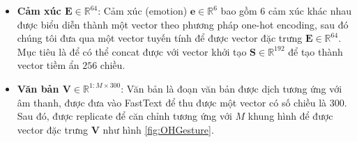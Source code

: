\begin{itemize}
	\item \textbf{Cảm xúc $\mathbf{E} \in \mathbb{R}^{64}$}: Cảm xúc (emotion) $\mathbf{e} \in \mathbb{R}^{6}$ bao gồm 6 cảm xúc khác nhau được biểu diễn thành một vector theo phương pháp one-hot encoding, sau đó chúng tôi đưa qua một vector tuyến tính để được vector đặc trưng $\mathbf{E} \in \mathbb{R}^{64}$. Mục tiêu là để có thể concat được với vector khởi tạo $\mathbf{S} \in \mathbb{R}^{192} $ để tạo thành vector tiềm ẩn $256$ chiều.
	
	
	\item \textbf{Văn bản $\mathbf{V} \in \mathbb{R}^{1:M \times 300}$}: Văn bản là đoạn văn bản được dịch tương ứng với âm thanh, được đưa vào FastText \cite{bojanowski2017enriching} để thu được một vector có số chiều là 300. Sau đó, được replicate để căn chỉnh tương ứng với $M$ khung hình để được vector đặc trưng $\mathbf{V}$ như hình \ref{fig:OHGesture}.
\end{itemize}

%
%
%
%

